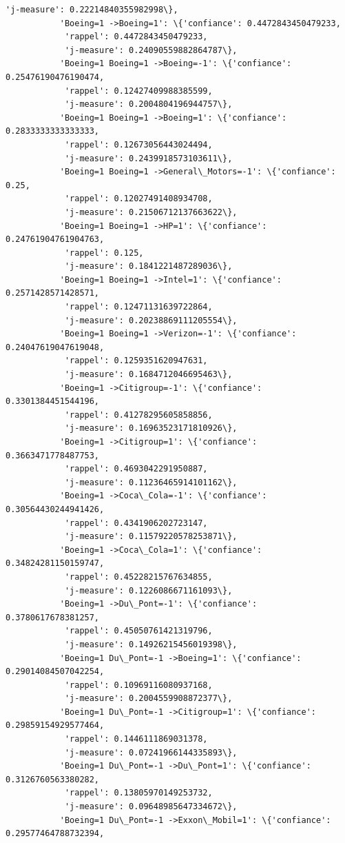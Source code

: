 \documentclass[11pt]{article}
\begin{document}
\begin{Verbatim}[commandchars=\\\{\}]
            'j-measure': 0.22214840355982998\},
           'Boeing=1 ->Boeing=1': \{'confiance': 0.4472843450479233,
            'rappel': 0.4472843450479233,
            'j-measure': 0.24090559882864787\},
           'Boeing=1 Boeing=1 ->Boeing=-1': \{'confiance': 0.25476190476190474,
            'rappel': 0.12427409988385599,
            'j-measure': 0.2004804196944757\},
           'Boeing=1 Boeing=1 ->Boeing=1': \{'confiance': 0.2833333333333333,
            'rappel': 0.12673056443024494,
            'j-measure': 0.2439918573103611\},
           'Boeing=1 Boeing=1 ->General\_Motors=-1': \{'confiance': 0.25,
            'rappel': 0.12027491408934708,
            'j-measure': 0.21506712137663622\},
           'Boeing=1 Boeing=1 ->HP=1': \{'confiance': 0.24761904761904763,
            'rappel': 0.125,
            'j-measure': 0.1841221487289036\},
           'Boeing=1 Boeing=1 ->Intel=1': \{'confiance': 0.2571428571428571,
            'rappel': 0.12471131639722864,
            'j-measure': 0.20238869111205554\},
           'Boeing=1 Boeing=1 ->Verizon=-1': \{'confiance': 0.24047619047619048,
            'rappel': 0.1259351620947631,
            'j-measure': 0.1684712046695463\},
           'Boeing=1 ->Citigroup=-1': \{'confiance': 0.3301384451544196,
            'rappel': 0.41278295605858856,
            'j-measure': 0.16963523171810926\},
           'Boeing=1 ->Citigroup=1': \{'confiance': 0.3663471778487753,
            'rappel': 0.4693042291950887,
            'j-measure': 0.11236465914101162\},
           'Boeing=1 ->Coca\_Cola=-1': \{'confiance': 0.30564430244941426,
            'rappel': 0.4341906202723147,
            'j-measure': 0.11579220578253871\},
           'Boeing=1 ->Coca\_Cola=1': \{'confiance': 0.34824281150159747,
            'rappel': 0.45228215767634855,
            'j-measure': 0.1226086671161093\},
           'Boeing=1 ->Du\_Pont=-1': \{'confiance': 0.3780617678381257,
            'rappel': 0.45050761421319796,
            'j-measure': 0.14926215456019398\},
           'Boeing=1 Du\_Pont=-1 ->Boeing=1': \{'confiance': 0.29014084507042254,
            'rappel': 0.10969116080937168,
            'j-measure': 0.2004559908872377\},
           'Boeing=1 Du\_Pont=-1 ->Citigroup=1': \{'confiance': 0.29859154929577464,
            'rappel': 0.1446111869031378,
            'j-measure': 0.07241966144335893\},
           'Boeing=1 Du\_Pont=-1 ->Du\_Pont=1': \{'confiance': 0.3126760563380282,
            'rappel': 0.13805970149253732,
            'j-measure': 0.09648985647334672\},
           'Boeing=1 Du\_Pont=-1 ->Exxon\_Mobil=1': \{'confiance': 0.29577464788732394,

\end{Verbatim}
\end{document}
